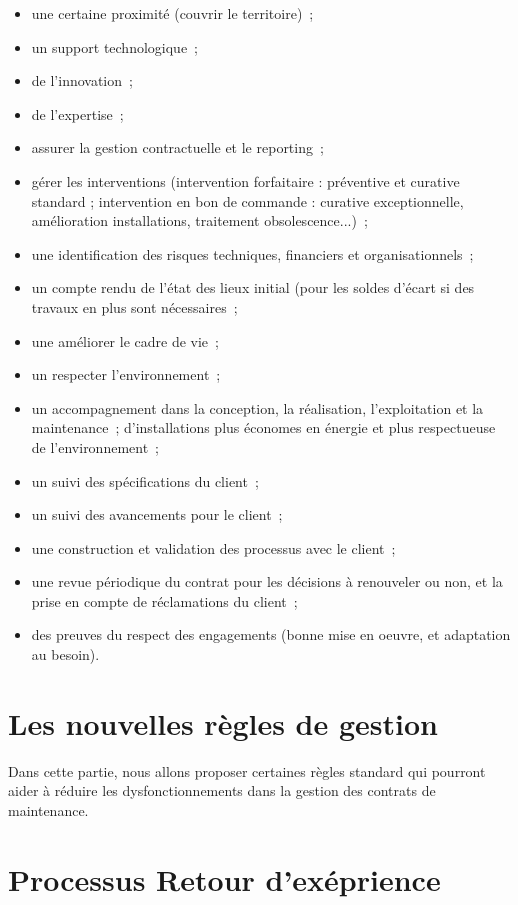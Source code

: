 \begin{itemize}
	\item une certaine proximité (couvrir le territoire)~;
	\item un support technologique~;
	\item de l'innovation~;
	\item de l'expertise~;

	\item assurer la gestion contractuelle et le reporting~;
	\item gérer les interventions (intervention forfaitaire : préventive et curative standard ; intervention en bon de commande : curative exceptionnelle, amélioration installations, traitement obsolescence...)~;
	\item une identification des risques techniques, financiers et organisationnels~;
	\item un compte rendu de l'état des lieux initial (pour les soldes d'écart si des travaux en plus sont nécessaires~;

	\item une améliorer le cadre de vie~;
	\item un respecter l'environnement~;

	\item un accompagnement dans la conception, la réalisation, l'exploitation et la maintenance~; d'installations plus économes en énergie et plus respectueuse de l'environnement~;
	\item un suivi des spécifications du client~;
	\item un suivi des avancements pour le client~;
	\item une construction et validation des processus avec le client~;
	\item une revue périodique du contrat pour les décisions à renouveler ou non, et la prise en compte de réclamations du client~;
	\item des preuves du respect des engagements (bonne mise en oeuvre, et adaptation au besoin).
\end{itemize}


\section{Les nouvelles règles de gestion}
Dans cette partie, nous allons proposer certaines règles standard qui pourront aider à réduire les dysfonctionnements dans la gestion des contrats de maintenance.


\section{Processus Retour d'exéprience}

